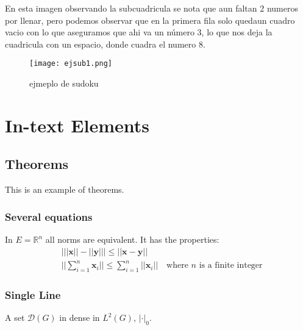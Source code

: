 \documentclass[11pt,fleqn]{book} %
\begin{document}
En esta imagen observando la subcuadricula se nota que aun faltan 2 numeros por llenar, pero podemos observar que en la primera fila solo quedaun cuadro vacio con lo que aseguramos que ahi va un número 3, lo que nos deja la cuadricula con un espacio, donde cuadra el numero 8.

\begin{figure}[h]
\centering\texttt{[image: ejsub1.png]}
\caption{ejmeplo de sudoku}
\end{figure}



\chapter{In-text Elements}

\section{Theorems}

This is an example of theorems.

\subsection{Several equations}

\begin{theorem}
In $E=\mathbb{R}^n$ all norms are equivalent. It has the properties:
\begin{align}
& \big| ||\mathbf{x}|| - ||\mathbf{y}|| \big|\leq || \mathbf{x}- \mathbf{y}||\\
&  ||\sum_{i=1}^n\mathbf{x}_i||\leq \sum_{i=1}^n||\mathbf{x}_i||\quad\text{where $n$ is a finite integer}
\end{align}
\end{theorem}

\subsection{Single Line}

\begin{theorem}
A set $\mathcal{D}(G)$ in dense in $L^2(G)$, $|\cdot|_0$. 
\end{theorem}
\end{document}
